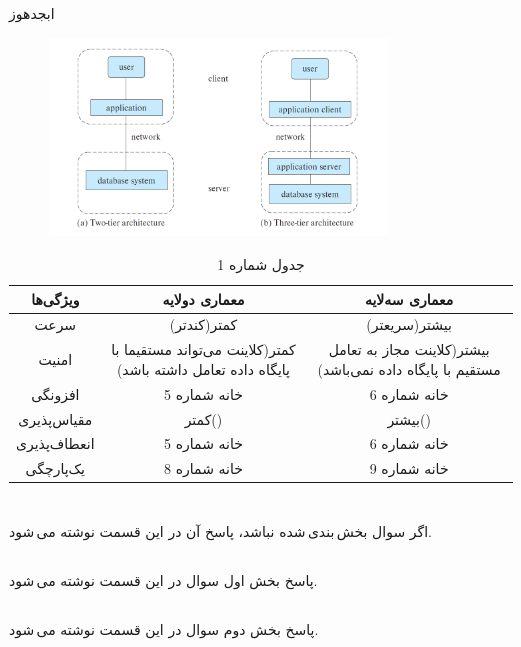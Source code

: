 \documentclass{article}
\begin{document}
\section{}
ابجدهوز
\begin{figure}[ht]
    \centering
    \includegraphics[width=0.8\textwidth]{figures/2.png}
    \caption{}
    \label{fig:fig1}
\end{figure}
\FloatBarrier
\begin{table}[ht]
    \centering
    \begin{tabular}{|c|c|c|}
    \hline
    ویژگی‌ها & معماری دولایه & معماری سه‌لایه\\
    \hline
    سرعت & کمتر(کندتر) & بیشتر(سریعتر)\\
    \hline
    امنیت & کمتر(کلاینت می‌تواند مستقیما با پایگاه داده تعامل داشته باشد) & بیشتر(کلاینت مجاز به تعامل مستقیم با پایگاه داده نمی‌باشد)\\
    \hline
    افزونگی & خانه شماره 5 & خانه شماره 6\\
    \hline
    مقیاس‌پذیری & کمتر() & بیشتر()\\
    \hline
    انعطاف‌پذیری & خانه شماره 5 & خانه شماره 6\\
    \hline
    یک‌پارچگی & خانه شماره 8 & خانه شماره 9\\
    \hline
    \end{tabular}
    \caption{جدول شماره 1}
    \label{tab:tab1}
\end{table}

\section{}
اگر سوال بخش\,بندی\,شده نباشد، پاسخ آن در این قسمت نوشته می\,شود.
\subsection{}
پاسخ بخش اول سوال در این قسمت نوشته می\,شود.
\subsection{}
پاسخ بخش دوم سوال در این قسمت نوشته می\,شود.
\end{document}
